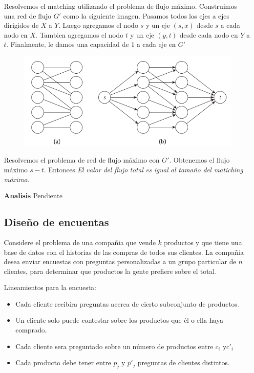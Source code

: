 \documentclass{article}
\begin{document}
Resolvemos el matching utilizando el problema de flujo máximo.
Construimos una red de flujo \(G'\) como la siguiente imagen. Pasamos todos los ejes a ejes dirigidos de
\(X\) a \(Y\). Luego agregamos el nodo \(s\) y un eje \((s,x)\) desde \(s\) a cada nodo en \(X\). 
Tambien agregamos el nodo \(t\) y un eje \((y,t)\) desde cada nodo en \(Y\) a \(t\).
Finalmente, le damos una capacidad de \(1\) a cada eje en \(G'\)

\begin{figure}[h!]
    \includegraphics[width=\linewidth]{imagenes/bipartito-redes-flujo.png}
\end{figure}

Resolvemos el problema de red de flujo máximo con \(G'\). Obtenemos el flujo máximo \(s-t\). Entonces
\textit{El valor del flujo total es igual al tamaño del matiching máximo.}

\textbf{Analisis} Pendiente

\newpage
\subsection{Diseño de encuentas}

Considere el problema de una compañia que vende \(k\) productos y que tiene una base de datos con el 
historias de las compras de todos sus clientes. La compañia desea enviar encuestas con preguntas
personalizadas a un grupo particular de \(n\) clientes, para determinar que productos la gente 
prefiere sobre el total.

Lineamientos para la encuesta:
\begin{itemize}
    \item Cada cliente recibira preguntas acerca de cierto subconjunto de productos.
    \item Un cliente solo puede contestar sobre los productos que él o ella haya comprado.
    \item Cada cliente sera preguntado sobre un número de productos entre \(c_i\) y\(c'_i\) 
    \item Cada producto debe tener entre \(p_j\) y \(p'_j\) preguntas de clientes distintos.
\end{itemize}
\end{document}
